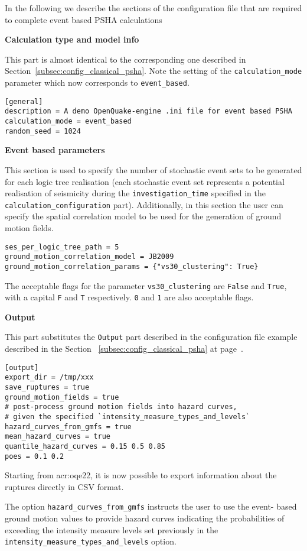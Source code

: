 In the following we describe the sections of the configuration file that are
required to complete event based PSHA calculations


\textbf{Calculation type and model info}

This part is almost identical to the corresponding one described in
Section~\ref{subsec:config_classical_psha}. Note the setting of the
\texttt{calculation\_mode} parameter which now corresponds to
\texttt{event\_based}.

\begin{verbatim}
[general]
description = A demo OpenQuake-engine .ini file for event based PSHA
calculation_mode = event_based
random_seed = 1024
\end{verbatim}

\textbf{Event based parameters}

This section is used to specify the number of stochastic event sets to be
generated for each logic tree realisation (each stochastic event set
represents a potential realisation of seismicity during the
\texttt{investigation\_time} specified in the
\texttt{calculation\_configuration} part). Additionally, in this section the
user can specify the spatial correlation model to be used for the generation
of ground motion fields.

\begin{verbatim}
ses_per_logic_tree_path = 5
ground_motion_correlation_model = JB2009
ground_motion_correlation_params = {"vs30_clustering": True}
\end{verbatim}

The acceptable flags for the parameter \verb+vs30_clustering+ are \verb+False+
and \verb+True+, with a capital \verb+F+ and \verb+T+ respectively. \verb+0+
and \verb+1+ are also acceptable flags.

\textbf{Output}

This part substitutes the \texttt{Output} part described in  the configuration
file example described in the Section~ \ref{subsec:config_classical_psha} at
page~\pageref{subsec:config_classical_psha}.

\begin{verbatim}
[output]
export_dir = /tmp/xxx
save_ruptures = true
ground_motion_fields = true
# post-process ground motion fields into hazard curves,
# given the specified `intensity_measure_types_and_levels`
hazard_curves_from_gmfs = true
mean_hazard_curves = true
quantile_hazard_curves = 0.15 0.5 0.85
poes = 0.1 0.2
\end{verbatim}

Starting from \glsdesc{acr:oqe22}, it is now possible to export information
about the ruptures directly in CSV format.

The option \verb=hazard_curves_from_gmfs= instructs the user to use the event-
based ground motion values to provide hazard curves indicating the
probabilities of exceeding the intensity measure levels set previously in the
\verb=intensity_measure_types_and_levels= option.
